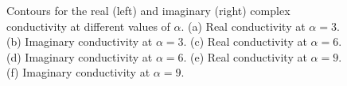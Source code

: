 \begin{figure}[h]
{\begin{subfigure}[b]{.6\textwidth}
\end{subfigure}%
}
\caption{Contours for the real (left) and imaginary (right) complex conductivity at different values of $\alpha$. (a) Real conductivity at $\alpha = 3$. (b) Imaginary conductivity at $\alpha = 3$. (c) Real conductivity at $\alpha = 6$. (d) Imaginary conductivity at $\alpha = 6$. (e) Real conductivity at $\alpha = 9$. (f) Imaginary conductivity at $\alpha = 9$.}
\label{fig:osakacontour}
\end{figure}

\begin{figure}[h]
\vspace*{-1.5cm}
\end{figure}
